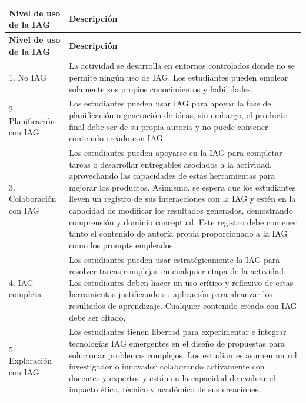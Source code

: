 \documentclass[11pt,a4paper]{article}
\begin{document}
\begin{center}
\small
\setlength{\tabcolsep}{4pt}
\begin{longtable}{|p{5cm}|p{10cm}|}
\hline
\textbf{Nivel de uso de la IAG} & \textbf{Descripción} \\
\hline
\endfirsthead

\hline
\textbf{Nivel de uso de la IAG} & \textbf{Descripción} \\
\hline
\endhead

1. No IAG &
La actividad se desarrolla en entornos controlados donde no se permite ningún uso de IAG. Los estudiantes pueden emplear solamente sus propios conocimientos y habilidades. \\
\hline

2. Planificación con IAG &
Los estudiantes pueden usar IAG para apoyar la fase de planificación o generación de ideas, sin embargo, el producto final debe ser de su propia autoría y no puede contener contenido creado con IAG. \\
\hline

3. Colaboración con IAG &
Los estudiantes pueden apoyarse en la IAG para completar tareas o desarrollar entregables asociados a la actividad, aprovechando las capacidades de estas herramientas para mejorar los productos. Asimismo, se espera que los estudiantes lleven un registro de sus interacciones con la IAG y estén en la capacidad de modificar los resultados generados, demostrando comprensión y dominio conceptual. Este registro debe contener tanto el contenido de autoría propia proporcionado a la IAG como los prompts empleados. \\
\hline

4. IAG completa &
Los estudiantes pueden usar estratégicamente la IAG para resolver tareas complejas en cualquier etapa de la actividad. Los estudiantes deben hacer un uso crítico y reflexivo de estas herramientas justificando su aplicación para alcanzar los resultados de aprendizaje. Cualquier contenido creado con IAG debe ser citado. \\
\hline

5. Exploración con IAG &
Los estudiantes tienen libertad para experimentar e integrar tecnologías IAG emergentes en el diseño de propuestas para solucionar problemas complejos. Los estudiantes asumen un rol investigador o innovador colaborando activamente con docentes y expertos y están en la capacidad de evaluar el impacto ético, técnico y académico de sus creaciones. \\
\hline

\end{longtable}
\end{center}
\end{document}
